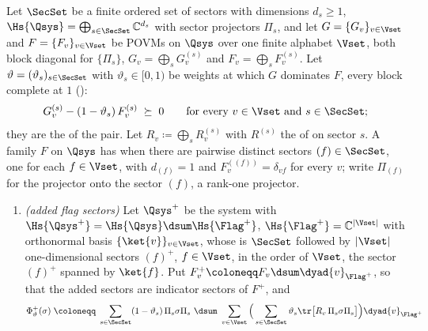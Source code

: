 \begin{definition}\label{def:domination-link}
Let $\SecSet$ be a finite ordered set of sectors with dimensions $d_s\ge1$,
$\Hs{\Qsys}=\bigoplus_{s\in\SecSet}\mathbb{C}^{d_s}$ with sector projectors
$\Pi_s$, and let $G=\{G_v\}_{v\in\Vset}$ and $F=\{F_v\}_{v\in\Vset}$ be POVMs
on $\Qsys$ over one finite alphabet $\Vset$, both block diagonal for
$\{\Pi_s\}$, $G_v=\bigoplus_sG^{(s)}_v$ and $F_v=\bigoplus_sF^{(s)}_v$. Let
$\vartheta=(\vartheta_s)_{s\in\SecSet}$ with $\vartheta_s\in[0,1)$ be weights at which
$G$ dominates $F$, every block complete at $1$
():
\begin{equation}\label{eq:dom-link}
  G^{(s)}_v-(1-\vartheta_s)\,F^{(s)}_v\;\succeq\;0
  \qquad\text{for every }v\in\Vset\text{ and }s\in\SecSet ;
\end{equation}
they are the
of the pair. Let $R_v\coloneqq\bigoplus_sR^{(s)}_v$ with $R^{(s)}$ the
 of  on sector $s$.
A family $F$ on $\Qsys$ has
when there are pairwise distinct sectors $(f)\in\SecSet$, one for each
$f\in\Vset$, with $d_{(f)}=1$ and $F^{((f))}_v=\delta_{vf}$ for every $v$;
write $\Pi_{(f)}$ for the projector onto the sector $(f)$, a rank-one
projector.
\begin{enumerate}[label=(\alph*),leftmargin=2.4em]
\item \emph{(added flag sectors)} Let $\Qsys^{+}$ be the system with
  $\Hs{\Qsys^{+}}=\Hs{\Qsys}\dsum\Hs{\Flag^{+}}$, $\Hs{\Flag^{+}}=\mathbb{C}^{|\Vset|}$
  with orthonormal basis $\{\ket{v}\}_{v\in\Vset}$, whose  is
  $\SecSet$ followed by $|\Vset|$ one-dimensional sectors $(f)^{+}$, $f\in\Vset$,
  in the order of $\Vset$, the sector $(f)^{+}$ spanned by $\ket{f}$. Put
  $F^{+}_v\coloneqq F_v\dsum\dyad{v}_{\Flag^{+}}$, so that the added sectors are
  indicator sectors of $F^{+}$, and
  \begin{equation}\label{eq:noise-fresh}
    \Phi^{+}_{\vartheta}(\sigma)\;\coloneqq\;
    \sum_{s\in\SecSet}(1-\vartheta_s)\,\Pi_s\sigma\Pi_s\ \dsum\
    \sum_{v\in\Vset}\Big(\sum_{s\in\SecSet}\vartheta_s
      \tr\big[R_v\,\Pi_s\sigma\Pi_s\big]\Big)\dyad{v}_{\Flag^{+}}
  \end{equation}

\end{enumerate}
\end{definition}
